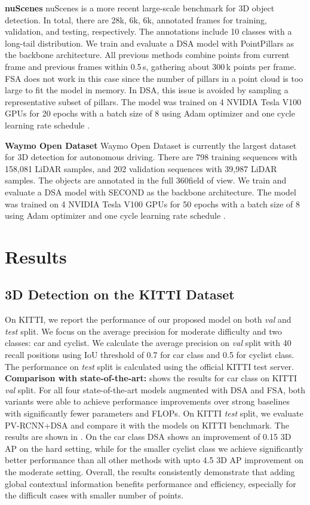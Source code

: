 \documentclass[10pt,twocolumn,letterpaper]{article}
\begin{document}
\textbf{nuScenes}
nuScenes \cite{nuscenes} is a more recent large-scale benchmark for 3D object detection. In total, there are 28k, 6k, 6k, annotated frames for training, validation, and testing, respectively. The annotations include 10 classes with a long-tail distribution. We train and evaluate a DSA model with PointPillars as the backbone architecture. All previous methods combine points from current frame and previous frames within 0.5\,s, gathering about 300\,k points per frame. FSA does not work in this case since the number of pillars in a point cloud is too large to fit the model in memory. In DSA, this issue is avoided by sampling a representative subset of pillars. The model was trained on 4 NVIDIA Tesla V100 GPUs for 20 epochs with a batch size of 8 using Adam optimizer \cite{Adam} and one cycle learning rate schedule \cite{onecycle}. 

\textbf{Waymo Open Dataset} Waymo Open Dataset \cite{waymo} is currently the largest dataset for 3D detection for autonomous  driving. There are 798 training sequences with 158,081 LiDAR samples, and 202 validation sequences with 39,987 LiDAR samples. The objects are annotated in the full 360\degree field of view. We train and evaluate a DSA model with SECOND as the backbone architecture. The model was trained on 4 NVIDIA Tesla V100 GPUs for 50 epochs with a batch size of 8 using Adam optimizer \cite{Adam} and one cycle learning rate schedule \cite{onecycle}. 
 \section{Results}
\subsection{3D Detection on the KITTI Dataset}
On KITTI, we report the performance of our proposed model on both \textit{val} and \textit{test} split. We focus on the average precision for moderate difficulty and two classes: car and cyclist. We calculate the average precision on \textit{val} split with 40 recall positions using IoU threshold of 0.7 for car class and 0.5 for cyclist class. The performance on \textit{test} split is calculated using the official KITTI test server.
\vspace{0.1cm}
\\ \textbf{Comparison with state-of-the-art:}  shows the results for car class on KITTI \textit{val} split. For all four state-of-the-art models augmented with DSA and FSA, both variants were able to achieve performance improvements over strong baselines with significantly fewer parameters and FLOPs. On KITTI \textit{test} split, we evaluate PV-RCNN+DSA and compare it with the models on KITTI benchmark. The results are shown in . On the car class DSA shows an improvement of 0.15 3D AP on the hard setting, while for the smaller cyclist class we achieve significantly better performance than all other methods with upto 4.5 3D AP improvement on the moderate setting. Overall, the results consistently demonstrate that adding global contextual information benefits performance and efficiency, especially for the difficult cases with smaller number of points.
\end{document}

